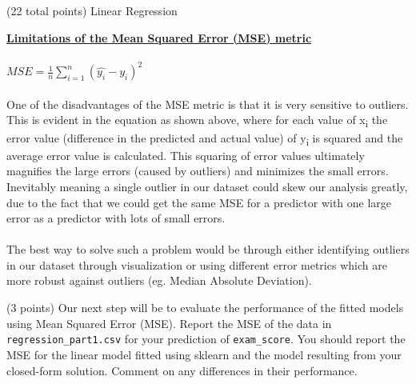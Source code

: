 \documentclass[12pt]{article}
\begin{document}
\begin{question}{(22 total points) Linear Regression}
\begin{subquestion}
\begin{answerbox}{22em}
\large{\textbf{\underline{Limitations of the Mean Squared Error (MSE) metric}}}\\
\\
\normalsize{
$MSE = \frac{1}{n}\sum_{i=1}^{n}(\hat{y_i}-y_i)^2$\\
\\
One of the disadvantages of the MSE metric is that it is very sensitive to outliers. This is evident in the equation as shown above, where for each value of x\textsubscript{i} the error value (difference in the predicted and actual value) of y\textsubscript{i} is squared and the average error value is calculated. This squaring of error values ultimately magnifies the large errors (caused by outliers) and minimizes the small errors. Inevitably meaning a single outlier in our dataset could skew our analysis greatly, due to the fact that we could get the same MSE for a predictor with one large error as a predictor with lots of small errors.\\
\\
The best way to solve such a problem would be through either identifying outliers in our dataset through visualization or using different error metrics which are more robust against outliers (eg. Median Absolute Deviation).}
\end{answerbox}



\end{subquestion}


 
%
%
\begin{subquestion}{(3 points) Our next step will be to evaluate the performance of the fitted models using Mean Squared Error (MSE). 
Report the MSE of the data in \texttt{regression\_part1.csv} for your prediction of \texttt{exam\_score}.
You should report the MSE for the linear model fitted using sklearn and the model resulting from your closed-form solution. 
Comment on any differences in their performance. 
}



\end{subquestion}
\end{question}
\end{document}
